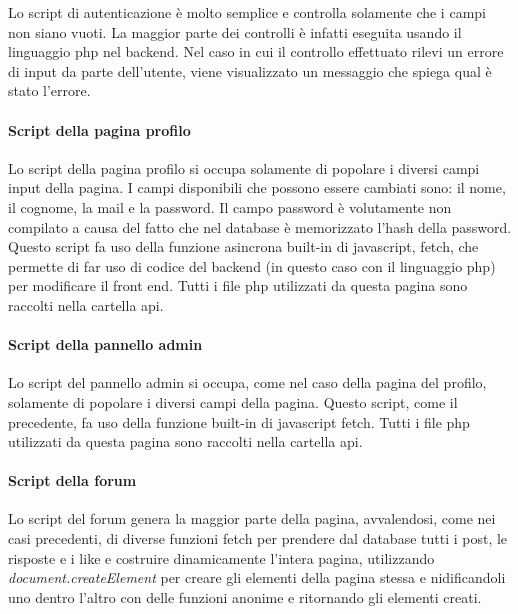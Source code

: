 Lo script di autenticazione è molto semplice e controlla solamente che i campi non siano vuoti. La maggior parte dei controlli è infatti eseguita usando il linguaggio php nel backend. Nel caso in cui il controllo effettuato rilevi un errore di input da parte dell'utente, viene visualizzato un messaggio che spiega qual è stato l'errore. 

\paragraph{Script della pagina profilo}

Lo script della pagina profilo si occupa solamente di popolare i diversi campi input della pagina. I campi disponibili che possono essere cambiati sono: il nome, il cognome, la mail e la password. Il campo password è volutamente non compilato a causa 
del fatto che nel database è memorizzato l'hash della password. Questo script fa uso della funzione asincrona built-in di javascript, fetch, che permette di far uso di codice del backend (in questo caso con il linguaggio php) per modificare il 
front end. Tutti i file php utilizzati da questa pagina sono raccolti nella cartella api.

\paragraph{Script della pannello admin}

Lo script del pannello admin si occupa, come nel caso della pagina del profilo, solamente di popolare i diversi campi della pagina. Questo script, come il precedente, fa uso della funzione built-in di javascript fetch. 
Tutti i file php utilizzati da questa pagina sono raccolti nella cartella api.

\paragraph{Script della forum}

Lo script del forum genera la maggior parte della pagina, avvalendosi, come nei casi precedenti, di diverse funzioni fetch per prendere dal database tutti i post, le risposte e i like e costruire dinamicamente l'intera pagina, utilizzando 
\textit{document.createElement} per creare gli elementi della pagina stessa e nidificandoli uno dentro l'altro con delle funzioni anonime e ritornando gli elementi creati. 




